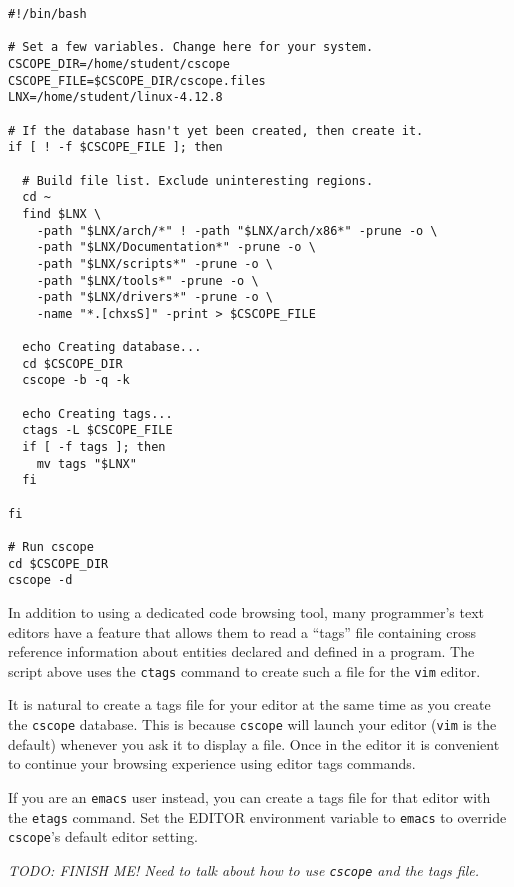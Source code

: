 \documentclass{article}
\newcommand{\command}[1]{\texttt{#1}}
\newcommand{\todo}[1]{\textit{TODO: #1}}
\begin{document}
\begin{verbatim}
#!/bin/bash

# Set a few variables. Change here for your system.
CSCOPE_DIR=/home/student/cscope
CSCOPE_FILE=$CSCOPE_DIR/cscope.files
LNX=/home/student/linux-4.12.8

# If the database hasn't yet been created, then create it.
if [ ! -f $CSCOPE_FILE ]; then

  # Build file list. Exclude uninteresting regions.
  cd ~
  find $LNX \
    -path "$LNX/arch/*" ! -path "$LNX/arch/x86*" -prune -o \
    -path "$LNX/Documentation*" -prune -o \
    -path "$LNX/scripts*" -prune -o \
    -path "$LNX/tools*" -prune -o \
    -path "$LNX/drivers*" -prune -o \
    -name "*.[chxsS]" -print > $CSCOPE_FILE

  echo Creating database...
  cd $CSCOPE_DIR
  cscope -b -q -k

  echo Creating tags...
  ctags -L $CSCOPE_FILE
  if [ -f tags ]; then
    mv tags "$LNX"
  fi

fi

# Run cscope
cd $CSCOPE_DIR
cscope -d
\end{verbatim}

In addition to using a dedicated code browsing tool, many programmer's text editors have a
feature that allows them to read a ``tags'' file containing cross reference information about
entities declared and defined in a program. The script above uses the \command{ctags} command to
create such a file for the \command{vim} editor.

It is natural to create a tags file for your editor at the same time as you create the
\command{cscope} database. This is because \command{cscope} will launch your editor
(\command{vim} is the default) whenever you ask it to display a file. Once in the editor it is
convenient to continue your browsing experience using editor tags commands.

If you are an \command{emacs} user instead, you can create a tags file for that editor with the
\command{etags} command. Set the EDITOR environment variable to \command{emacs} to override
\command{cscope}'s default editor setting.

\todo{FINISH ME! Need to talk about how to use \command{cscope} and the tags file.}
\end{document}
